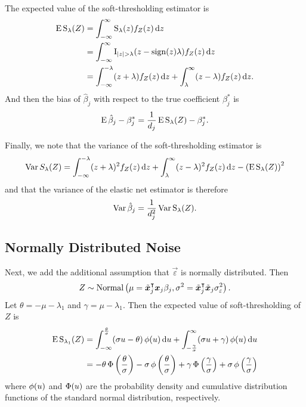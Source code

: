 The expected value of the soft-thresholding estimator is
\begin{align*}
  \label{eq:st-expected-value}
  \operatorname{E} \operatorname{S}_\lambda(Z) & = \int_{-\infty}^\infty \operatorname{S}_\lambda(z) f_Z(z) \mathop{}\!\mathrm{d} z                                                   \nonumber \\
                    & = \int_{-\infty}^\infty \operatorname{I}_{|z| > \lambda} (z -\operatorname{sign}(z)\lambda) f_Z(z) \mathop{}\!\mathrm{d} z                         \nonumber \\
                    & = \int_{-\infty}^{-\lambda}(z + \lambda)f_Z(z) \mathop{}\!\mathrm{d} z + \int_{\lambda}^\infty (z - \lambda)f_Z(z) \mathop{}\!\mathrm{d} z.
\end{align*}
And then the bias of \(\hat\beta_j\) with respect to the true coefficient \(\beta_j^*\) is
\begin{equation*}
  \label{eq:betahat-bias}
  \operatorname{E} \hat\beta_j - \beta_j^* = \frac{1}{d_j}\operatorname{E} \operatorname{S}_\lambda(Z) - \beta^*_j.
\end{equation*}

Finally, we note that the variance of the soft-thresholding estimator is
\begin{equation}
  \label{eq:st-variance}
  \operatorname{Var} {S_\lambda(Z)} = \int_{-\infty}^{-\lambda}(z + \lambda)^2f_Z(z) \mathop{}\!\mathrm{d} z + \int_{\lambda}^\infty (z - \lambda)^2 f_Z(z) \mathop{}\!\mathrm{d} z - \left(\operatorname{E} \operatorname{S}_\lambda(Z)\right)^2
\end{equation}
and that the variance of the elastic net estimator is therefore
\begin{equation}
  \label{eq:betahat-variance}
  \operatorname{Var} \hat\beta_j = \frac{1}{d_j^2} \operatorname{Var} \operatorname{S}_\lambda(Z).
\end{equation}

\subsection{Normally Distributed Noise}

Next, we add the additional assumption that \(\vec{\varepsilon}\) is normally distributed. Then
\[
  Z \sim \operatorname{Normal}\left(\mu = \tilde{\boldsymbol{x}}_j^\intercal\boldsymbol{x}_j \beta_j, \sigma^2 = \tilde{\boldsymbol{x}}_j^\intercal\tilde{\boldsymbol{x}}_j \sigma_\varepsilon^2 \right).
\]
Let \(\theta = -\mu -\lambda_1 \) and \(\gamma = \mu - \lambda_1\). Then the expected value of soft-thresholding of \(Z\) is
\begin{align}
  \operatorname{E} \operatorname{S}_{\lambda_1}(Z) & = \int_{-\infty}^\frac{\theta}{\sigma} (\sigma u - \theta) \operatorname{\phi}(u) \mathop{}\!\mathrm{d} u + \int_{-\frac{\gamma}{\sigma}}^\infty (\sigma u + \gamma) \operatorname{\phi}(u) \mathop{}\!\mathrm{d} u                                               \nonumber                      \\
                        & = -\theta \operatorname{\Phi}\left(\frac{\theta}{\sigma}\right) - \sigma \operatorname{\phi}\left(\frac{\theta}{\sigma}\right) + \gamma \operatorname{\Phi}\left(\frac{\gamma}{\sigma}\right) + \sigma \operatorname{\phi}\left(\frac{\gamma}{\sigma}\right) \label{eq:mean-centered-eval}
\end{align}
where \(\operatorname{\phi}(u)\) and \(\operatorname{\Phi}(u)\) are the probability density and cumulative distribution functions of the standard normal distribution, respectively.

